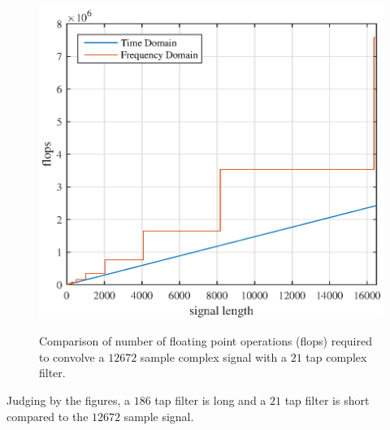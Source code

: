 \begin{figure}
	\caption{Comparison of number of floating point operations (flops) required to convolve a $12672$ sample complex signal with a $21$ tap complex filter.}
	\centering\includegraphics[width=5in]{figures/gpu_intro/Theory21Tap_flops.eps}
	\label{fig:Theory21Tap_flops}
\end{figure}
Judging by the figures, a $186$ tap filter is long and a $21$ tap filter is short compared to the $12672$ sample signal.

